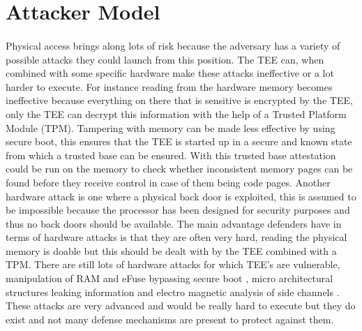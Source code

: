 \section{Attacker Model}

\paragraph*{}
Physical access brings along lots of risk because the adversary has a variety of possible attacks they could launch from this position. The TEE can, when combined with some specific hardware make these attacks ineffective or a lot harder to execute. For instance reading from the hardware memory becomes ineffective because everything on there that is sensitive is encrypted by the TEE, only the TEE can decrypt this information with the help of a Trusted Platform Module (TPM). Tampering with memory can be made less effective by using secure boot, this ensures that the TEE is started up in a secure and known state from which a trusted base can be ensured. With this trusted base attestation could be run on the memory to check whether inconsistent memory pages can be found before they receive control in case of them being code pages. Another hardware attack is one where a physical back door is exploited, this is assumed to be impossible because the processor has been designed for security purposes and thus no back doors should be available. The main advantage defenders have in terms of hardware attacks is that they are often very hard, reading the physical memory is doable but this should be dealt with by the TEE combined with a TPM. There are still lots of hardware attacks for which TEE's are vulnerable, manipulation of RAM and eFuse bypassing secure boot \cite{GrossMathieu2021BTmi}, micro architectural structures leaking information \cite{RyanKeegan2019HHEE} and electro magnetic analysis of side channels \cite{BukasaSebanjilaKevin2018HTCB}. These attacks are very advanced and would be really hard to execute but they do exist and not many defense mechanisms are present to protect against them.

